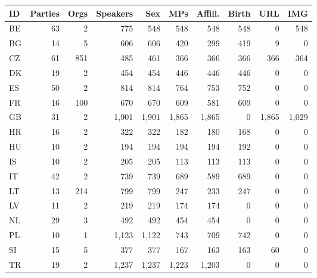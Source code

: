 \begin{tabular}{l|rrrrrrrrr}
ID&Parties&Orgs&Speakers&Sex&MPs&Affill.&Birth&URL&IMG\\
\hline
BE&63&2&775&548&548&548&548&0&548\\
BG&14&5&606&606&420&299&419&9&0\\
CZ&61&851&485&461&366&366&366&366&364\\
DK&19&2&454&454&446&446&446&0&0\\
ES&50&2&814&814&764&753&752&0&0\\
FR&16&100&670&670&609&581&609&0&0\\
GB&31&2&1,901&1,901&1,865&1,865&0&1,865&1,029\\
HR&16&2&322&322&182&180&168&0&0\\
HU&10&2&194&194&194&194&192&0&0\\
IS&10&2&205&205&113&113&113&0&0\\
IT&42&2&739&739&689&589&689&0&0\\
LT&13&214&799&799&247&233&247&0&0\\
LV&11&2&219&219&174&174&0&0&0\\
NL&29&3&492&492&454&454&0&0&0\\
PL&10&1&1,123&1,122&743&709&742&0&0\\
SI&15&5&377&377&167&163&163&60&0\\
TR&19&2&1,237&1,237&1,223&1,203&0&0&0\\
\end{tabular}
